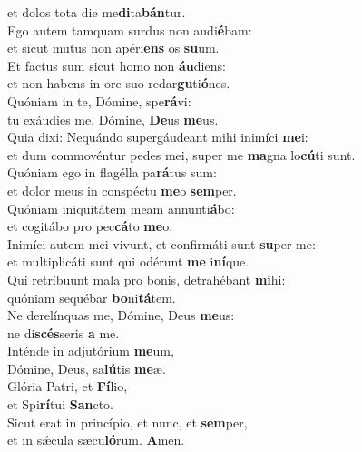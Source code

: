 \oddverse et dolos tota die me\textbf{di}ta\textbf{bán}tur.\\
\evenverse Ego autem tamquam surdus non audi\textbf{é}bam:~\*\\
\evenverse et sicut mutus non apéri\textbf{ens} os \textbf{su}um.\\
\oddverse Et factus sum sicut homo non \textbf{áu}diens:~\*\\
\oddverse et non habens in ore suo redar\textbf{gu}ti\textbf{ó}nes.\\
\evenverse Quóniam in te, Dómine, spe\textbf{rá}vi:~\*\\
\evenverse tu exáudies me, Dómine, \textbf{De}us \textbf{me}us.\\
\oddverse Quia dixi: Nequándo supergáudeant mihi inimíci \textbf{me}i:~\*\\
\oddverse et dum commovéntur pedes mei, super me \textbf{ma}gna lo\textbf{cú}ti sunt.\\
\evenverse Quóniam ego in flagélla pa\textbf{rá}tus sum:~\*\\
\evenverse et dolor meus in conspéctu \textbf{me}o \textbf{sem}per.\\
\oddverse Quóniam iniquitátem meam annunti\textbf{á}bo:~\*\\
\oddverse et cogitábo pro pec\textbf{cá}to \textbf{me}o.\\
\evenverse Inimíci autem mei vivunt, et confirmáti sunt \textbf{su}per me:~\*\\
\evenverse et multiplicáti sunt qui odérunt \textbf{me} i\textbf{ní}que.\\
\oddverse Qui retríbuunt mala pro bonis, detrahébant \textbf{mi}hi:~\*\\
\oddverse quóniam sequébar \textbf{bo}ni\textbf{tá}tem.\\
\evenverse Ne derelínquas me, Dómine, Deus \textbf{me}us:~\*\\
\evenverse ne di\textbf{scés}seris \textbf{a} me.\\
\oddverse Inténde in adjutórium \textbf{me}um,~\*\\
\oddverse Dómine, Deus, sa\textbf{lú}tis \textbf{me}æ.\\
\evenverse Glória Patri, et \textbf{Fí}lio,~\*\\
\evenverse et Spi\textbf{rí}tui \textbf{San}cto.\\
\oddverse Sicut erat in princípio, et nunc, et \textbf{sem}per,~\*\\
\oddverse et in sǽcula sæcu\textbf{ló}rum. \textbf{A}men.\\
